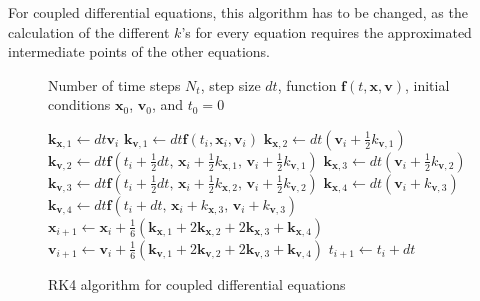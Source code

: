 For coupled differential equations, this algorithm has to be changed, as the calculation of the different $k$'s for every equation requires the approximated intermediate points of the other equations.
\begin{figure}[h]
    \begin{algorithm}[H]
        \caption{RK4 algorithm for coupled differential equations}
        \label{algo:RK4couple}

        \begin{algorithmic}[1]
            \Require Number of time steps $N_t$, step size $dt$,
                     function $\boldsymbol{f}(t,\boldsymbol{x},\boldsymbol{v})$,
                     initial conditions $\boldsymbol{x}_0$, $\boldsymbol{v}_0$,
                     and $t_0=0$

                \State $\boldsymbol{k}_{\boldsymbol{x},1} \gets dt\boldsymbol{v}_i$
                \State $\boldsymbol{k}_{\boldsymbol{v},1} \gets
                    dt\boldsymbol{f}(t_i,\boldsymbol{x}_i,\boldsymbol{v}_i)$ 
                \Statex %
                \State $\boldsymbol{k}_{\boldsymbol{x},2} \gets
                    dt\left(\boldsymbol{v}_i+\frac{1}{2}k_{\boldsymbol{v},1}\right)$
                \State $\boldsymbol{k}_{\boldsymbol{v},2} \gets
                    dt\boldsymbol{f}\left(
                    t_i+\frac{1}{2}dt,\,
                    \boldsymbol{x}_i+\frac{1}{2}k_{\boldsymbol{x},1},\,
                    \boldsymbol{v}_i+\frac{1}{2}k_{\boldsymbol{v},1}
                    \right)$ 
                \Statex %
                \State $\boldsymbol{k}_{\boldsymbol{x},3} \gets
                    dt\left(\boldsymbol{v}_i+\frac{1}{2}k_{\boldsymbol{v},2}\right)$
                \State $\boldsymbol{k}_{\boldsymbol{v},3} \gets
                    dt\boldsymbol{f}\left(
                    t_i+\frac{1}{2}dt,\,
                    \boldsymbol{x}_i+\frac{1}{2}k_{\boldsymbol{x},2},\,
                    \boldsymbol{v}_i+\frac{1}{2}k_{\boldsymbol{v},2}
                    \right)$ 
                \Statex %
                \State $\boldsymbol{k}_{\boldsymbol{x},4} \gets
                    dt\left(\boldsymbol{v}_i+k_{\boldsymbol{v},3}\right)$
                \State $\boldsymbol{k}_{\boldsymbol{v},4} \gets
                    dt\boldsymbol{f}\left(
                    t_i+dt,\,
                    \boldsymbol{x}_i+k_{\boldsymbol{x},3},\,
                    \boldsymbol{v}_i+k_{\boldsymbol{v},3}
                    \right)$ 
                \Statex %
                \State $\boldsymbol{x}_{i+1} \gets \boldsymbol{x}_i
                    +\frac{1}{6}\left(
                    \boldsymbol{k}_{\boldsymbol{x},1}+2\boldsymbol{k}_{\boldsymbol{x},2}
                    +2\boldsymbol{k}_{\boldsymbol{x},3}+\boldsymbol{k}_{\boldsymbol{x},4}
                    \right)$ 
                \State $\boldsymbol{v}_{i+1} \gets \boldsymbol{v}_i
                    +\frac{1}{6}\left(
                    \boldsymbol{k}_{\boldsymbol{v},1}+2\boldsymbol{k}_{\boldsymbol{v},2}
                    +2\boldsymbol{k}_{\boldsymbol{v},3}+\boldsymbol{k}_{\boldsymbol{v},4}
                    \right)$ 
                \State $t_{i+1} \gets t_i+dt$
            \EndFor


\end{algorithmic}
\end{algorithm}
\end{figure}
